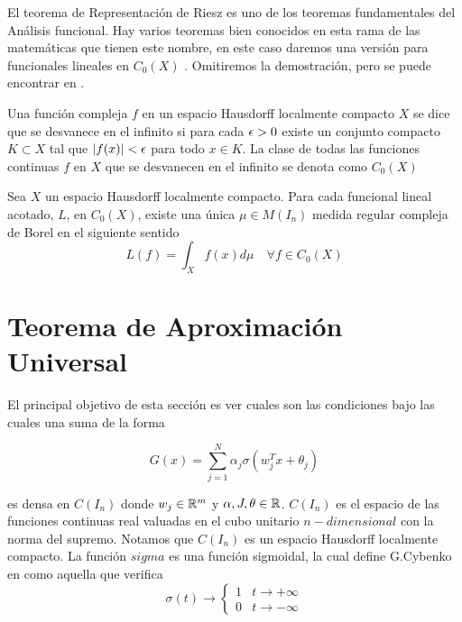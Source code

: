     El teorema de Representación de Riesz es uno de los teoremas fundamentales del Análisis funcional. Hay varios teoremas bien conocidos en esta rama de las matemáticas que tienen este nombre, en este caso daremos una versión para funcionales lineales en $C_0(X)$ . Omitiremos la demostración, pero se puede encontrar en \cite{RealComplexAnalisis}. \\
    
    \begin{definicion}
    Una función compleja $f$ en un espacio Hausdorff localmente compacto $X$ se dice que se desvanece en el infinito si para cada $\epsilon > 0$ existe un conjunto compacto $K \subset X$ tal que $|f(x)| < \epsilon$ para todo $x \in K$. La clase de todas las funciones continuas $f$ en $X$ que se desvanecen en el infinito se denota como $C_0(X)$
    \end{definicion}
    
    \begin{teorema}\label{teorema:TRRiesz}    
    Sea $X$ un espacio Hausdorff localmente compacto. Para cada funcional lineal acotado, $L$, en $C_0(X)$, existe una única ${\mu \in M(I_n)}$ medida regular compleja de Borel en el siguiente sentido
    \begin{equation}
        L(f) = \int_{X} f(x) d\mu \quad \forall f \in C_0(X)
    \end{equation}
    \end{teorema}
    
    
    
    
\section{Teorema de Aproximación Universal}

    El principal objetivo de esta sección es ver cuales son las condiciones bajo las cuales una suma de la forma
    
    \begin{equation}\label{eq:salidaRNN}
        G(x) = \sum_{j=1}^N \alpha_j \sigma( w_j^Tx + \theta_j )
    \end{equation}
    
    
    \noindent es densa en $C(I_n)$ donde $w_j \in \mathbb{R}^m$ y $\alpha,J, \theta \in \mathbb{R}$. $C(I_n)$ es el espacio de las funciones continuas real valuadas en el cubo unitario $n-dimensional$ con la norma del supremo. Notamos que $C(I_n)$ es un espacio Hausdorff localmente compacto. La función $sigma$ es una función sigmoidal, la cual define G.Cybenko en \cite{TeoremaAproxUni} como aquella que verifica
    \begin{equation} 
        \sigma(t) \rightarrow \left\{ 
        \begin{array}{cc}
             1 & t \to + \infty \\
             0 & t \to - \infty
        \end{array}
        \right.
    \end{equation}
    
